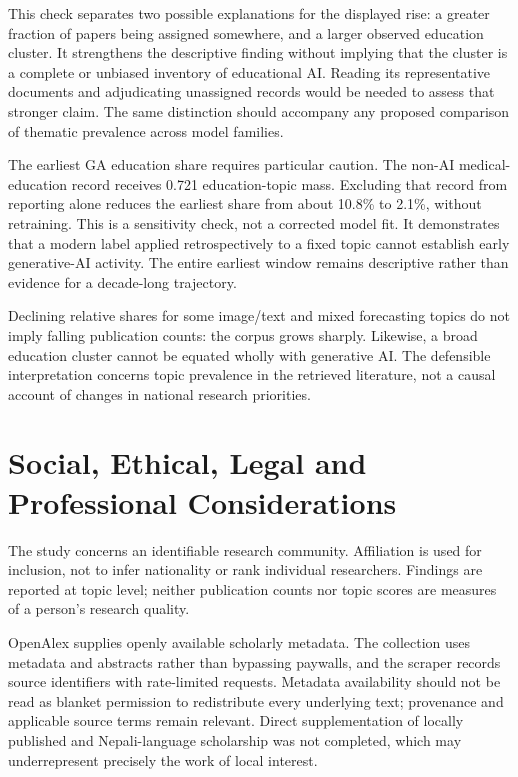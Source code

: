 This check separates two possible explanations for the displayed rise: a greater fraction of
papers being assigned somewhere, and a larger observed education cluster. It strengthens the
descriptive finding without implying that the cluster is a complete or unbiased inventory of
educational AI. Reading its representative documents and adjudicating unassigned records would
be needed to assess that stronger claim. The same distinction should accompany any proposed
comparison of thematic prevalence across model families.

The earliest GA education share requires particular caution. The non-AI medical-education
record receives 0.721 education-topic mass. Excluding that record from reporting alone reduces
the earliest share from about 10.8\% to 2.1\%, without retraining. This is a sensitivity check,
not a corrected model fit. It demonstrates that a modern label applied retrospectively to a
fixed topic cannot establish early generative-AI activity. The entire earliest window remains
descriptive rather than evidence for a decade-long trajectory.

Declining relative shares for some image/text and mixed forecasting topics do not imply falling
publication counts: the corpus grows sharply. Likewise, a broad education cluster cannot be
equated wholly with generative AI. The defensible interpretation concerns topic prevalence in
the retrieved literature, not a causal account of changes in national research priorities.

\section{Social, Ethical, Legal and Professional Considerations}
\label{sec:selp}
The study concerns an identifiable research community. Affiliation is used for inclusion, not
to infer nationality or rank individual researchers. Findings are reported at topic level;
neither publication counts nor topic scores are measures of a person's research quality.

OpenAlex supplies openly available scholarly metadata. The collection uses metadata and
abstracts rather than bypassing paywalls, and the scraper records source identifiers with
rate-limited requests. Metadata availability should not be read as blanket permission to
redistribute every underlying text; provenance and applicable source terms remain relevant.
Direct supplementation of locally published and Nepali-language scholarship was not completed,
which may underrepresent precisely the work of local interest.

